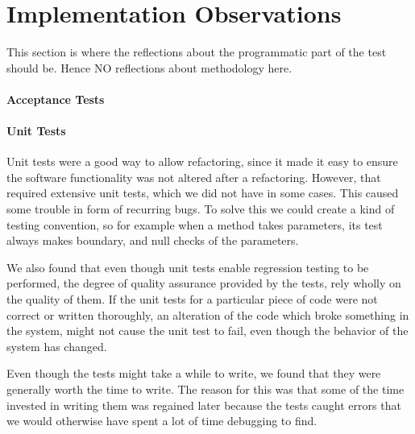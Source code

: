 \section{Implementation Observations}
This section is where the reflections about the programmatic part of the test should be. Hence NO reflections about methodology here.

\paragraph{Acceptance Tests}

\paragraph{Unit Tests}
Unit tests were a good way to allow refactoring, since it made it easy to ensure the software functionality was not altered after a refactoring. However, that required extensive unit tests, which we did not have in some cases. This caused some trouble in form of recurring bugs. To solve this we could create a kind of testing convention, so for example when a method takes parameters, its test always makes boundary, and null checks of the parameters. %


We also found that even though unit tests enable regression testing to be performed, the degree of quality assurance provided by the tests, rely wholly on the quality of them. If the unit tests for a particular piece of code were not correct or written thoroughly, an alteration of the code which broke something in the system, might not cause the unit test to fail, even though the behavior of the system has changed.

Even though the tests might take a while to write, we found that they were generally worth the time to write. The reason for this was that some of the time invested in writing them was regained later because the tests caught errors that we would otherwise have spent a lot of time debugging to find.

